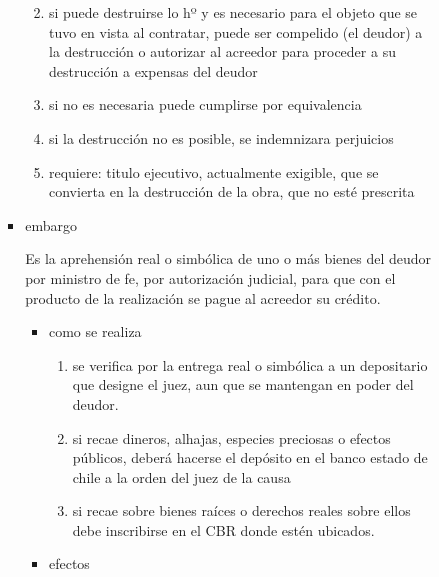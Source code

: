 \documentclass[]{article}
\providecommand{\tightlist}{%
  \setlength{\itemsep}{0pt}\setlength{\parskip}{0pt}}
\begin{document}
\begin{itemize}
\begin{itemize}
\begin{enumerate}
\begin{itemize}
        \begin{enumerate}
        \def\labelenumii{\arabic{enumii}.}
        \tightlist
        \item
          si puede destruirse lo hº y es necesario para el objeto que se
          tuvo en vista al contratar, puede ser compelido (el deudor) a
          la destrucción o autorizar al acreedor para proceder a su
          destrucción a expensas del deudor
        \item
          si no es necesaria puede cumplirse por equivalencia
        \item
          si la destrucción no es posible, se indemnizara perjuicios
        \item
          requiere: titulo ejecutivo, actualmente exigible, que se
          convierta en la destrucción de la obra, que no esté prescrita
        \end{enumerate}
      \item
        embargo

        Es la aprehensión real o simbólica de uno o más bienes del
        deudor por ministro de fe, por autorización judicial, para que
        con el producto de la realización se pague al acreedor su
        crédito.

        \begin{itemize}
        \tightlist
        \item
          como se realiza

          \begin{enumerate}
          \def\labelenumii{\arabic{enumii}.}
          \tightlist
          \item
            se verifica por la entrega real o simbólica a un depositario
            que designe el juez, aun que se mantengan en poder del
            deudor.
          \item
            si recae dineros, alhajas, especies preciosas o efectos
            públicos, deberá hacerse el depósito en el banco estado de
            chile a la orden del juez de la causa
          \item
            si recae sobre bienes raíces o derechos reales sobre ellos
            debe inscribirse en el CBR donde estén ubicados.
          \end{enumerate}
        \item
          efectos


\end{itemize}
\end{itemize}
\end{enumerate}
\end{itemize}
\end{itemize}
\end{document}
